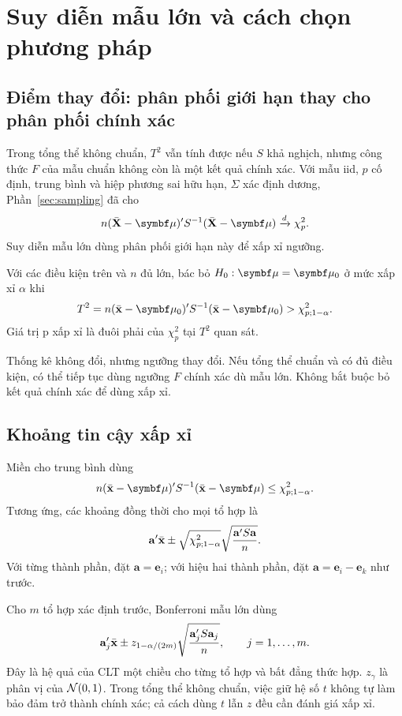 \clearpage
\section{Suy diễn mẫu lớn và cách chọn phương pháp}
\label{sec:large}

\subsection{Điểm thay đổi: phân phối giới hạn thay cho phân phối chính xác}
Trong tổng thể không chuẩn, $T^2$ vẫn tính được nếu $S$ khả nghịch,
nhưng công thức $F$ của mẫu chuẩn không còn là một kết quả chính xác.
Với mẫu iid, $p$ cố định, trung bình và hiệp phương sai hữu hạn, $\Sigma$
xác định dương, Phần~\ref{sec:sampling} đã cho
\[
 n(\Xbar-\vmu)'S^{-1}(\Xbar-\vmu)\xrightarrow{d}\chi^2_p.
\]
Suy diễn mẫu lớn dùng phân phối giới hạn này để xấp xỉ ngưỡng.

\begin{result}
Với các điều kiện trên và $n$ đủ lớn, bác bỏ $H_0:\vmu=\vmu_0$ ở mức
xấp xỉ $\alpha$ khi
\begin{equation}
 T^2=n(\xbar-\vmu_0)'S^{-1}(\xbar-\vmu_0)>\chi^2_{p;1-\alpha}.
 \label{eq:largetest}
\end{equation}
Giá trị p xấp xỉ là đuôi phải của $\chi^2_p$ tại $T^2$ quan sát.
\end{result}

Thống kê không đổi, nhưng ngưỡng thay đổi. Nếu tổng thể chuẩn và có đủ
điều kiện, có thể tiếp tục dùng ngưỡng $F$ chính xác dù mẫu lớn.
Không bắt buộc bỏ kết quả chính xác để dùng xấp xỉ.

\subsection{Khoảng tin cậy xấp xỉ}
Miền cho trung bình dùng
\[
 n(\xbar-\vmu)'S^{-1}(\xbar-\vmu)\le\chi^2_{p;1-\alpha}.
\]
Tương ứng, các khoảng đồng thời cho mọi tổ hợp là
\begin{equation}
 \mathbf a'\bar{\mathbf x}\pm\sqrt{\chi^2_{p;1-\alpha}}
 \sqrt{\frac{\mathbf a'S\mathbf a}{n}}.
 \label{eq:largeinterval}
\end{equation}
Với từng thành phần, đặt $\mathbf a=\mathbf e_i$; với hiệu hai thành
phần, đặt $\mathbf a=\mathbf e_i-\mathbf e_k$ như trước.

Cho $m$ tổ hợp xác định trước, Bonferroni mẫu lớn dùng
\begin{equation}
 \mathbf a_j'\bar{\mathbf x}\pm z_{1-\alpha/(2m)}
 \sqrt{\frac{\mathbf a_j'S\mathbf a_j}{n}},\qquad j=1,\ldots,m.
 \label{eq:largebonf}
\end{equation}
Đây là hệ quả của CLT một chiều cho từng tổ hợp và bất đẳng thức hợp.
$z_\gamma$ là phân vị của $\mathcal N(0,1)$.
Trong tổng thể không chuẩn, việc giữ hệ số $t$ không tự làm bảo đảm trở
thành chính xác; cả cách dùng $t$ lẫn $z$ đều cần đánh giá xấp xỉ.

